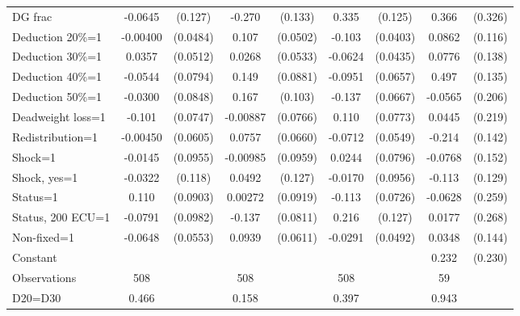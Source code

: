 \begin{tabular}{l|cccccc|cc}
DG frac         &  -0.0645         &  (0.127)&   -0.270\sym{**} &  (0.133)&    0.335\sym{***}&  (0.125)&    0.366         &  (0.326)\\
Deduction 20\%=1& -0.00400         & (0.0484)&    0.107\sym{**} & (0.0502)&   -0.103\sym{**} & (0.0403)&   0.0862         &  (0.116)\\
Deduction 30\%=1&   0.0357         & (0.0512)&   0.0268         & (0.0533)&  -0.0624         & (0.0435)&   0.0776         &  (0.138)\\
Deduction 40\%=1&  -0.0544         & (0.0794)&    0.149\sym{*}  & (0.0881)&  -0.0951         & (0.0657)&    0.497\sym{***}&  (0.135)\\
Deduction 50\%=1&  -0.0300         & (0.0848)&    0.167         &  (0.103)&   -0.137\sym{**} & (0.0667)&  -0.0565         &  (0.206)\\
Deadweight loss=1&   -0.101         & (0.0747)& -0.00887         & (0.0766)&    0.110         & (0.0773)&   0.0445         &  (0.219)\\
Redistribution=1& -0.00450         & (0.0605)&   0.0757         & (0.0660)&  -0.0712         & (0.0549)&   -0.214         &  (0.142)\\
Shock=1         &  -0.0145         & (0.0955)& -0.00985         & (0.0959)&   0.0244         & (0.0796)&  -0.0768         &  (0.152)\\
Shock, yes=1    &  -0.0322         &  (0.118)&   0.0492         &  (0.127)&  -0.0170         & (0.0956)&   -0.113         &  (0.129)\\
Status=1        &    0.110         & (0.0903)&  0.00272         & (0.0919)&   -0.113         & (0.0726)&  -0.0628         &  (0.259)\\
Status, 200 ECU=1&  -0.0791         & (0.0982)&   -0.137\sym{*}  & (0.0811)&    0.216\sym{*}  &  (0.127)&   0.0177         &  (0.268)\\
Non-fixed=1     &  -0.0648         & (0.0553)&   0.0939         & (0.0611)&  -0.0291         & (0.0492)&   0.0348         &  (0.144)\\
Constant        &                  &         &                  &         &                  &         &    0.232         &  (0.230)\\
\hline
Observations    &      508         &         &      508         &         &      508         &         &       59         &         \\
D20=D30         &    0.466         &         &    0.158         &         &    0.397         &         &    0.943         &         \\

\end{tabular}
